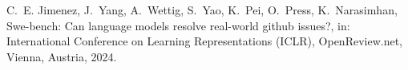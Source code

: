 \documentclass[10pt,a4paper]{article}
\providecommand{\bibinfo}[2]{#2}
\begin{document}
\FloatBarrier
\begin{thebibliography}{1}
\bibinfo{author}{C.~E. Jimenez}, \bibinfo{author}{J.~Yang},
  \bibinfo{author}{A.~Wettig}, \bibinfo{author}{S.~Yao},
  \bibinfo{author}{K.~Pei}, \bibinfo{author}{O.~Press},
  \bibinfo{author}{K.~Narasimhan},
\newblock \bibinfo{title}{Swe-bench: Can language models resolve real-world
  github issues?},
\newblock in: \bibinfo{booktitle}{International Conference on Learning
  Representations (ICLR)}, \bibinfo{publisher}{OpenReview.net},
  \bibinfo{address}{Vienna, Austria}, \bibinfo{year}{2024}.
\end{thebibliography}
\end{document}
